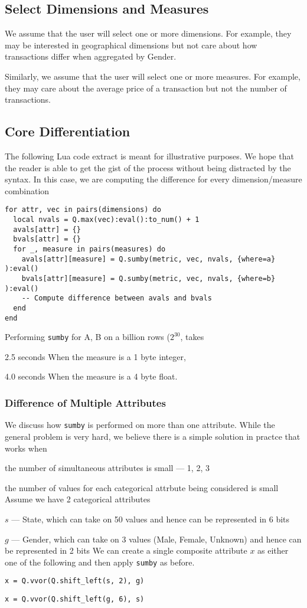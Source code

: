 \subsection{Select Dimensions and Measures}
\label{DimsAndMeasures}

We assume that the user will select one or more dimensions. For example, they
may be interested in geographical dimensions but not care about how transactions
differ when aggregated by Gender. 

Similarly, we assume that the user will select one or more measures. For
example, they may care about the average
price of a transaction but not the number of transactions.

\subsection{Core Differentiation}
\label{Differentiation}

The following Lua code extract is meant for illustrative purposes. We hope that
the reader is able to get the gist of the process without being distracted by
the syntax. In this case, we are computing the difference for every
dimension/measure combination
\begin{verbatim}
for attr, vec in pairs(dimensions) do 
  local nvals = Q.max(vec):eval():to_num() + 1
  avals[attr] = {}
  bvals[attr] = {}
  for _, measure in pairs(measures) do 
    avals[attr][measure] = Q.sumby(metric, vec, nvals, {where=a} ):eval()
    bvals[attr][measure] = Q.sumby(metric, vec, nvals, {where=b} ):eval()
    -- Compute difference between avals and bvals
  end
end
\end{verbatim}
Performing {\tt sumby} for A, B on a billion rows (\(2^{30}\), takes 
\be
\item 2.5 seconds When the measure is a 1 byte integer, 
\item 4.0 seconds When the measure is a 4 byte float.
\ee

\subsubsection{Difference of Multiple Attributes}

We discuss how {\tt sumby} is performed on more than one attribute. While the
general problem is very hard, we believe there is a simple solution in practce
that works when
\be
\item the number of simultaneous attributes is small --- 1, 2, 3
\item the number of values for each categorical attrbute being considered is
small
\ee
Assume we have 2 categorical attributes
\be
\item \(s\) --- State, which can take on 50 values and hence can be represented in 6 bits
\item \(g\) --- Gender, which can take on 3 values (Male, Female, Unknown) and hence can
be represented in 2 bits
\ee
We can create a single composite attribute \(x\) as either one of the following
and then apply {\tt sumby} as before. 
\be
\item \verb+x = Q.vvor(Q.shift_left(s, 2), g)+
\item \verb+x = Q.vvor(Q.shift_left(g, 6), s)+
\ee

